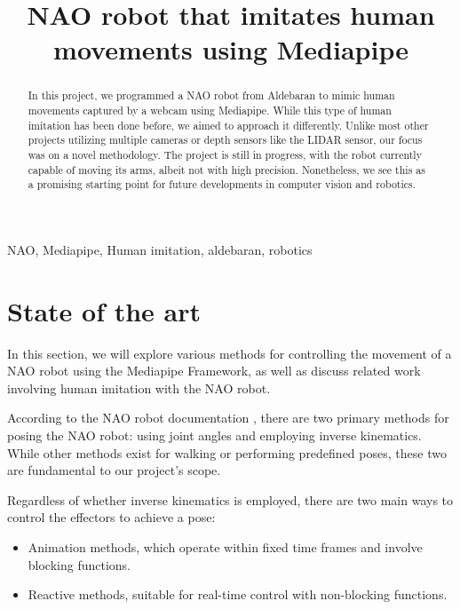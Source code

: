 \documentclass[conference]{IEEEtran}
\begin{document}
\title{NAO robot that imitates human movements using Mediapipe\\

}

\author{
}

\maketitle

\begin{abstract}
In this project, we programmed a NAO robot from Aldebaran to mimic human movements captured by a webcam using Mediapipe. While this type of human imitation has been done before, we aimed to approach it differently. Unlike most other projects utilizing multiple cameras or depth sensors like the LIDAR sensor, our focus was on a novel methodology.
The project is still in progress, with the robot currently capable of moving its arms, albeit not with high precision. Nonetheless, we see this as a promising starting point for future developments in computer vision and robotics.
\end{abstract}

\begin{IEEEkeywords}
NAO, Mediapipe, Human imitation, aldebaran, robotics
\end{IEEEkeywords}
\section{State of the art}
In this section, we will explore various methods for controlling the movement of a NAO robot using the Mediapipe Framework, as well as discuss related work involving human imitation with the NAO robot.

According to the NAO robot documentation \cite{b1}, there are two primary methods for posing the NAO robot: using joint angles and employing inverse kinematics. While other methods exist for walking or performing predefined poses, these two are fundamental to our project's scope.

Regardless of whether inverse kinematics is employed, there are two main ways to control the effectors to achieve a pose:
\begin{itemize}
    \item Animation methods, which operate within fixed time frames and involve blocking functions.
    \item Reactive methods, suitable for real-time control with non-blocking functions.
\end{itemize}
\end{document}
